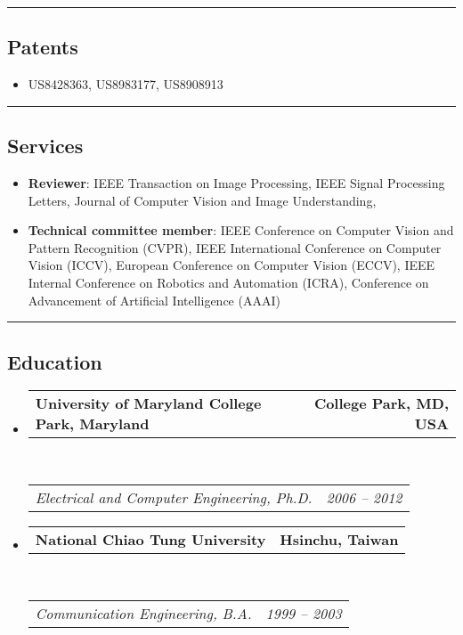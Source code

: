 \documentclass[10pt,letterpaper]{article}
\makeatletter
\newcommand{\headerrow}[2]
{\begin{tabular*}{\linewidth}{l@{\extracolsep{\fill}}r}
	#1 &
	#2 \\
\end{tabular*}}
\makeatother
\begin{document}
\hrule
\vspace{-0.4em}
\subsection*{Patents}
\begin{itemize}
\item US8428363, US8983177, US8908913 \vspace{-2mm}
\end{itemize}

\hrule
\vspace{-0.4em}
\subsection*{Services}
\begin{itemize}
\item {\bf Reviewer}: IEEE Transaction on Image Processing, IEEE Signal Processing Letters, Journal of Computer Vision and Image Understanding, \vspace{-2mm}
\item {\bf Technical committee member}: IEEE Conference on Computer Vision and Pattern Recognition (CVPR), IEEE International Conference on Computer Vision (ICCV), European Conference on Computer Vision (ECCV), IEEE Internal Conference on Robotics and Automation (ICRA), Conference on Advancement of Artificial Intelligence (AAAI)\vspace{-2mm}
\end{itemize}

\hrule
\vspace{-0.4em}
\subsection*{Education}

\begin{itemize}
	\parskip=0.1em

	\item
	\headerrow
		{\textbf{University of Maryland College Park, Maryland}}
		{\textbf{College Park, MD, USA}}
	\\
	\headerrow
		{\emph{Electrical and Computer Engineering, Ph.D.}}
		{\emph{2006 -- 2012}}
	\item
	\headerrow
		{\textbf{National Chiao Tung University}}
		{\textbf{Hsinchu, Taiwan}}
	\\
	\headerrow
		{\emph{Communication Engineering, B.A.}}
		{\emph{1999 -- 2003}}

\end{itemize}
\end{document}
